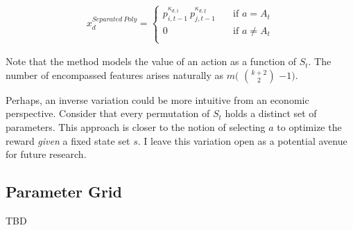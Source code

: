 \begin{gather}\label{separated_poly_extraction}
x_d^{Separated~Poly} = \begin{cases}
p_{i, t-1}^{\kappa_{d,1}} ~ p_{j, t-1}^{\kappa_{d,2}} & \quad \text{if } a = A_t  \\
0 & \quad \text{if } a \ne A_t \\ \end{cases} 
\end{gather}

Note that the method models the value of an action as a function of $S_t$. The number of encompassed features arises naturally as $m($ $k+2\choose2$ $-1)$.


Perhaps, an inverse variation could be more intuitive from an economic perspective. Consider that every permutation of $S_t$ holds a distinct set of parameters. This approach is closer to the notion of selecting $a$ to optimize the reward \emph{given} a fixed state set $s$. I leave this variation open as a potential avenue for future research.

\subsection{Parameter Grid}

TBD